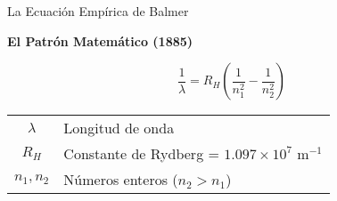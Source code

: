 \documentclass[12pt,aspectratio=169]{beamer}
\begin{document}
\begin{frame}{La Ecuación Empírica de Balmer}
    \begin{center}
        \huge \textbf{El Patrón Matemático (1885)}
    \end{center}
    
    \vspace{1cm}
    \begin{center}
        \colorbox{azuloscuro!10}{\parbox{0.8\textwidth}{
            \begin{center}
                \Huge \textcolor{azuloscuro}{
                    $$\frac{1}{\lambda} = R_H\left(\frac{1}{n_1^2} - \frac{1}{n_2^2}\right)$$
                }
            \end{center}
        }}
    \end{center}
    
    \vspace{1cm}
    \begin{center}
        \begin{tabular}{cl}
            \Large $\lambda$ & \Large Longitud de onda \\[0.3cm]
            \Large $R_H$ & \Large Constante de Rydberg = $1.097 \times 10^7$ m$^{-1}$ \\[0.3cm]
            \Large $n_1, n_2$ & \Large Números enteros ($n_2 > n_1$)
        \end{tabular}
    \end{center}
\end{frame}
\end{document}
